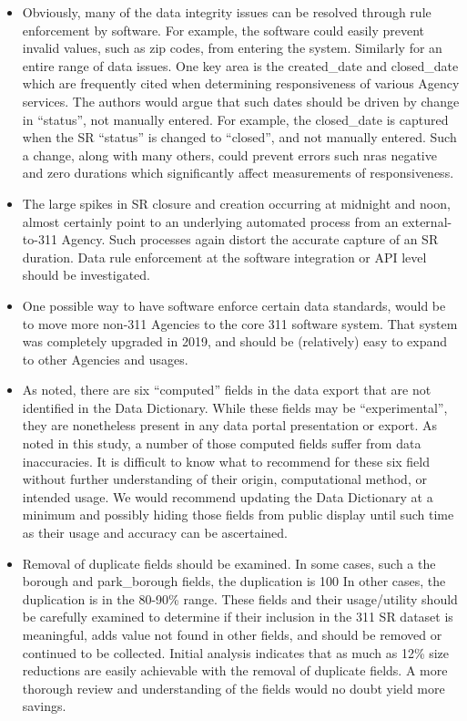 \documentclass[12pt, titlepage]{article}
\begin{document}
{\begin{itemize}
	\item Obviously, many of the data integrity issues can be resolved through rule enforcement by software. 
	For example, the software could easily prevent invalid values, such as zip codes, 
	from entering the system. Similarly for an entire range of data issues. One key area is the
	created\_date and closed\_date which are frequently cited when determining 
	responsiveness of various Agency services. The authors would argue that such dates 
	should be driven by change in ``status'', not manually entered. For example, the closed\_date is captured
	when the SR ``status'' is changed to ``closed'', and not manually entered. Such a change, along with many others, could prevent errors such
	nras negative and  zero durations which significantly affect measurements of responsiveness. 
	
	\item The large spikes in SR closure and creation occurring at midnight and noon, almost certainly point to an underlying automated
	process from an external-to-311 Agency. Such processes again distort the accurate capture of an SR duration. Data rule enforcement
	at the software integration or API level should be investigated.

	\item One possible way to have software enforce certain data standards, would be to move more non-311 Agencies to the core 311
	software system. That system was completely upgraded in 2019, and should be (relatively) easy to expand to other Agencies and usages.
	
	\item As noted, there are six ``computed'' fields in the data export that are not identified in the Data Dictionary. While these fields may be
	``experimental'', they are nonetheless present in any data portal presentation or export. As noted in this study, a number of those computed
	fields suffer from data inaccuracies. It is difficult to know what to recommend for these six field without further understanding
	of their origin, computational method, or intended usage. We would recommend updating the Data Dictionary at a minimum and
	possibly hiding those fields from public display until such time as their usage and accuracy can be ascertained.
	
	\item Removal of duplicate fields should be examined.  In some cases, such a the borough and park\_borough fields, the duplication is 100%
	In other cases, the duplication is in the 80-90\% range. These fields and their usage/utility should be carefully examined to determine if their
	inclusion in the 311 SR dataset is meaningful, adds value not found in other fields, and should be removed or continued to be collected.
	Initial analysis indicates that as much as 12\% size reductions are easily achievable with the removal of duplicate fields. A more thorough
	review and understanding of the fields would no doubt yield more savings. 
	

\end{itemize}}
\end{document}
